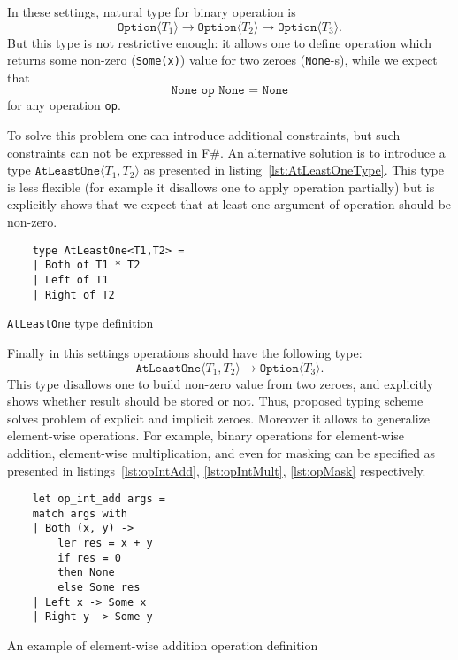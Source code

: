 In these settings, natural type for binary operation is $$\texttt{Option}\langle T_1 \rangle \to \texttt{Option}\langle T_2 \rangle \to \texttt{Option}\langle T_3 \rangle.$$ But this type is not restrictive enough: it allows one to define operation which returns some non-zero (\texttt{Some(x)}) value for two zeroes (\texttt{None}-s), while we expect that $$\texttt{None op None = None}$$ for any operation \texttt{op}.   

To solve this problem one can introduce additional constraints, but such constraints can not be expressed in F\#.
An alternative solution is to introduce a type $\texttt{AtLeastOne} \langle T_1, T_2 \rangle$ as presented in listing~\ref{lst:AtLeastOneType}. This type is less flexible (for example it disallows one to apply operation partially) but is explicitly shows that we expect that at least one argument of operation should be non-zero. 

\begin{listing}[h]
    \begin{verbatim}
    type AtLeastOne<T1,T2> =
    | Both of T1 * T2
    | Left of T1
    | Right of T2
    \end{verbatim}
    \caption{\texttt{AtLeastOne} type definition}
    \label{lst:AtLeastOneType}
\end{listing}

Finally in this settings operations should have the following type: $$\texttt{AtLeastOne} \langle T_1, T_2 \rangle \to \texttt{Option}\langle T_3 \rangle.$$
This type disallows one to build non-zero value from two zeroes, and explicitly shows whether result should be stored or not.
Thus, proposed typing scheme solves problem of explicit and implicit zeroes.
Moreover it allows to generalize element-wise operations.
For example, binary operations for element-wise addition, element-wise multiplication, and even for masking can be specified as presented in listings~\ref{lst:opIntAdd}, \ref{lst:opIntMult}, \ref{lst:opMask} respectively.

\begin{listing}[h]
    \begin{verbatim}
    let op_int_add args =
    match args with
    | Both (x, y) -> 
        ler res = x + y 
        if res = 0 
        then None 
        else Some res 
    | Left x -> Some x
    | Right y -> Some y
    \end{verbatim}
    \caption{An example of element-wise addition operation definition}
    \label{lst:opIntAdd}
\end{listing}

